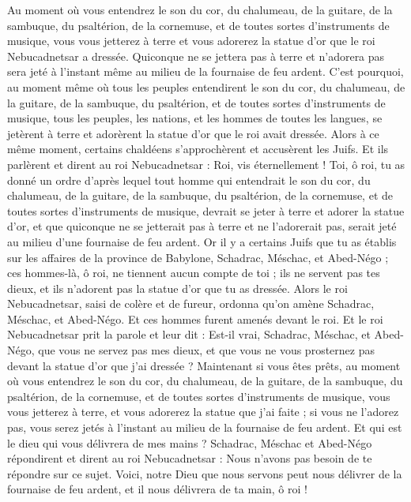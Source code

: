 \begin{multicols}{2}
Au moment où vous entendrez le son du cor, du chalumeau, de la guitare, de la sambuque, du psaltérion, de la cornemuse, et de toutes sortes d'instruments de musique, vous vous jetterez à terre et vous adorerez la statue d'or que le roi Nebucadnetsar a dressée.
Quiconque ne se jettera pas à terre et n'adorera pas sera jeté à l'instant même au milieu de la fournaise de feu ardent.
C'est pourquoi, au moment même où tous les peuples entendirent le son du cor, du chalumeau, de la guitare, de la sambuque, du psaltérion, et de toutes sortes d'instruments de musique, tous les peuples, les nations, et les hommes de toutes les langues, se jetèrent à terre et adorèrent la statue d'or que le roi avait dressée.
Alors à ce même moment, certains chaldéens s'approchèrent et accusèrent les Juifs.
Et ils parlèrent et dirent au roi Nebucadnetsar : Roi, vis éternellement !
Toi, ô roi, tu as donné un ordre d'après lequel tout homme qui entendrait le son du cor, du chalumeau, de la guitare, de la sambuque, du psaltérion, de la cornemuse, et de toutes sortes d'instruments de musique, devrait se jeter à terre et adorer la statue d'or,
et que quiconque ne se jetterait pas à terre et ne l'adorerait pas, serait jeté au milieu d'une fournaise de feu ardent.
Or il y a certains Juifs que tu as établis sur les affaires de la province de Babylone, Schadrac, Méschac, et Abed-Négo ; ces hommes-là, ô roi, ne tiennent aucun compte de toi ; ils ne servent pas tes dieux, et ils n'adorent pas la statue d'or que tu as dressée.
Alors le roi Nebucadnetsar, saisi de colère et de fureur, ordonna qu'on amène Schadrac, Méschac, et Abed-Négo. Et ces hommes furent amenés devant le roi.
Et le roi Nebucadnetsar prit la parole et leur dit : Est-il vrai, Schadrac, Méschac, et Abed-Négo, que vous ne servez pas mes dieux, et que vous ne vous prosternez pas devant la statue d'or que j'ai dressée ?
Maintenant si vous êtes prêts, au moment où vous entendrez le son du cor, du chalumeau, de la guitare, de la sambuque, du psaltérion, de la cornemuse, et de toutes sortes d'instruments de musique, vous vous jetterez à terre, et vous adorerez la statue que j'ai faite ; si vous ne l'adorez pas, vous serez jetés à l'instant au milieu de la fournaise de feu ardent. Et qui est le dieu qui vous délivrera de mes mains ?
Schadrac, Méschac et Abed-Négo répondirent et dirent au roi Nebucadnetsar : Nous n'avons pas besoin de te répondre sur ce sujet.
Voici, notre Dieu que nous servons peut nous délivrer de la fournaise de feu ardent, et il nous délivrera de ta main, ô roi !

\end{multicols}
